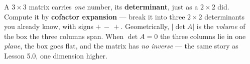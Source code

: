 \documentclass[10pt]{article}
\begin{document}
\vspace{0.10in}

\begin{remindbox}
\small A $3\times3$ matrix carries \emph{one} number, its \textbf{determinant}, just as a $2\times2$
did. Compute it by \textbf{cofactor expansion} --- break it into three $2\times2$ determinants you
already know, with signs $+\,-\,+$. Geometrically, $|\det A|$ is the \emph{volume} of the box the
three columns span. When $\det A=0$ the three columns lie in one \emph{plane}, the box goes flat, and
the matrix has \emph{no inverse} --- the same story as Lesson 5.0, one dimension higher.
\end{remindbox}
\end{document}
